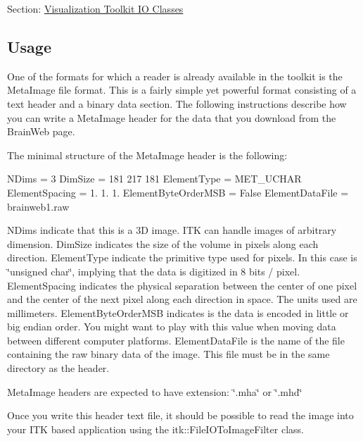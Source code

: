 Section\-: \hyperlink{sec_vtkio}{Visualization Toolkit I\-O Classes} \hypertarget{vtkwidgets_vtkxyplotwidget_Usage}{}\subsection{Usage}\label{vtkwidgets_vtkxyplotwidget_Usage}
One of the formats for which a reader is already available in the toolkit is the Meta\-Image file format. This is a fairly simple yet powerful format consisting of a text header and a binary data section. The following instructions describe how you can write a Meta\-Image header for the data that you download from the Brain\-Web page.

The minimal structure of the Meta\-Image header is the following\-:

N\-Dims = 3 Dim\-Size = 181 217 181 Element\-Type = M\-E\-T\-\_\-\-U\-C\-H\-A\-R Element\-Spacing = 1. 1. 1. Element\-Byte\-Order\-M\-S\-B = False Element\-Data\-File = brainweb1.\-raw

N\-Dims indicate that this is a 3\-D image. I\-T\-K can handle images of arbitrary dimension. Dim\-Size indicates the size of the volume in pixels along each direction. Element\-Type indicate the primitive type used for pixels. In this case is \char`\"{}unsigned char\char`\"{}, implying that the data is digitized in 8 bits / pixel. Element\-Spacing indicates the physical separation between the center of one pixel and the center of the next pixel along each direction in space. The units used are millimeters. Element\-Byte\-Order\-M\-S\-B indicates is the data is encoded in little or big endian order. You might want to play with this value when moving data between different computer platforms. Element\-Data\-File is the name of the file containing the raw binary data of the image. This file must be in the same directory as the header.

Meta\-Image headers are expected to have extension\-: \char`\"{}.\-mha\char`\"{} or \char`\"{}.\-mhd\char`\"{}

Once you write this header text file, it should be possible to read the image into your I\-T\-K based application using the itk\-::\-File\-I\-O\-To\-Image\-Filter class.

